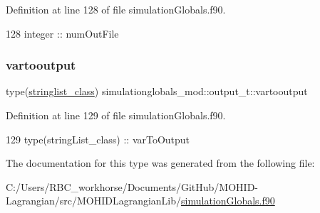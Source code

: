 Definition at line 128 of file simulation\+Globals.\+f90.


\begin{DoxyCode}
128         \textcolor{keywordtype}{integer} :: numOutFile
\end{DoxyCode}
\mbox{\label{structsimulationglobals__mod_1_1output__t_a12ae742ee427e1fc02644195444291cd}} 
\subsubsection{\texorpdfstring{vartooutput}{vartooutput}}
{\footnotesize\ttfamily type(\mbox{\hyperlink{structsimulationglobals__mod_1_1stringlist__class}{stringlist\+\_\+class}}) simulationglobals\+\_\+mod\+::output\+\_\+t\+::vartooutput\hspace{0.3cm}{\ttfamily [private]}}



Definition at line 129 of file simulation\+Globals.\+f90.


\begin{DoxyCode}
129         \textcolor{keywordtype}{type}(stringList\_class) :: varToOutput
\end{DoxyCode}


The documentation for this type was generated from the following file\+:\begin{DoxyCompactItemize}
\item 
C\+:/\+Users/\+R\+B\+C\+\_\+workhorse/\+Documents/\+Git\+Hub/\+M\+O\+H\+I\+D-\/\+Lagrangian/src/\+M\+O\+H\+I\+D\+Lagrangian\+Lib/\mbox{\hyperlink{simulation_globals_8f90}{simulation\+Globals.\+f90}}\end{DoxyCompactItemize}
